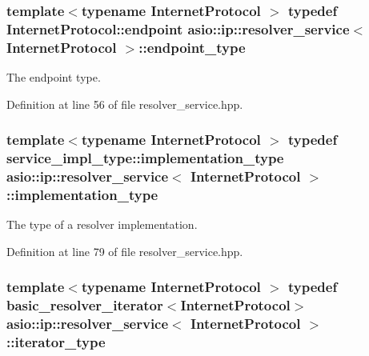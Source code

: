 \subsubsection[{endpoint\+\_\+type}]{\setlength{\rightskip}{0pt plus 5cm}template$<$typename Internet\+Protocol $>$ typedef Internet\+Protocol\+::endpoint {\bf asio\+::ip\+::resolver\+\_\+service}$<$ Internet\+Protocol $>$\+::{\bf endpoint\+\_\+type}}\label{classasio_1_1ip_1_1resolver__service_aa51d73a98d9f6a1df7ca69a419fa7bc3}


The endpoint type. 



Definition at line 56 of file resolver\+\_\+service.\+hpp.

\hypertarget{classasio_1_1ip_1_1resolver__service_aa686664be9b5626ca662d4603ae3459b}{}
\subsubsection[{implementation\+\_\+type}]{\setlength{\rightskip}{0pt plus 5cm}template$<$typename Internet\+Protocol $>$ typedef {\bf service\+\_\+impl\+\_\+type\+::implementation\+\_\+type} {\bf asio\+::ip\+::resolver\+\_\+service}$<$ Internet\+Protocol $>$\+::{\bf implementation\+\_\+type}}\label{classasio_1_1ip_1_1resolver__service_aa686664be9b5626ca662d4603ae3459b}


The type of a resolver implementation. 



Definition at line 79 of file resolver\+\_\+service.\+hpp.

\hypertarget{classasio_1_1ip_1_1resolver__service_a7b71bd80a7d9296ac334251bed0e2b4c}{}
\subsubsection[{iterator\+\_\+type}]{\setlength{\rightskip}{0pt plus 5cm}template$<$typename Internet\+Protocol $>$ typedef {\bf basic\+\_\+resolver\+\_\+iterator}$<$Internet\+Protocol$>$ {\bf asio\+::ip\+::resolver\+\_\+service}$<$ Internet\+Protocol $>$\+::{\bf iterator\+\_\+type}}\label{classasio_1_1ip_1_1resolver__service_a7b71bd80a7d9296ac334251bed0e2b4c}


